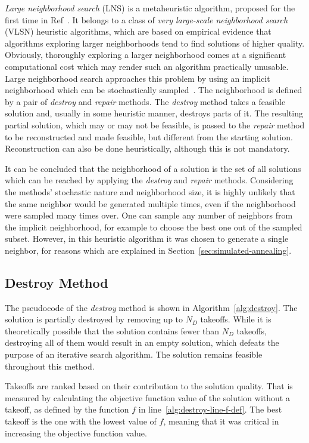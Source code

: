 \textit{Large neighborhood search} (LNS) is a metaheuristic algorithm, proposed for the first time in Ref~\cite{Shaw/LNS}.
It belongs to a class of \textit{very large-scale neighborhood search} (VLSN) heuristic algorithms, which are based on empirical evidence that algorithms exploring larger neighborhoods tend to find solutions of higher quality.
Obviously, thoroughly exploring a larger neighborhood comes at a significant computational cost which may render such an algorithm practically unusable.
Large neighborhood search approaches this problem by using an implicit neighborhood which can be stochastically sampled~\cite{Pisinger/LNS}.
The neighborhood is defined by a pair of \textit{destroy} and \textit{repair} methods.
The \textit{destroy} method takes a feasible solution and, usually in some heuristic manner, destroys parts of it.
The resulting partial solution, which may or may not be feasible, is passed to the \textit{repair} method to be reconstructed and made feasible, but different from the starting solution.
Reconstruction can also be done heuristically, although this is not mandatory.

It can be concluded that the neighborhood of a solution is the set of all solutions which can be reached by applying the \textit{destroy} and \textit{repair} methods.
Considering the methods' stochastic nature and neighborhood size, it is highly unlikely that the same neighbor would be generated multiple times, even if the neighborhood were sampled many times over.
One can sample any number of neighbors from the implicit neighborhood, for example to choose the best one out of the sampled subset. 
However, in this heuristic algorithm it was chosen to generate a single neighbor, for reasons which are explained in Section~\ref{sec:simulated-annealing}.


\subsection{Destroy Method}

The pseudocode of the \textit{destroy} method is shown in Algorithm~\ref{alg:destroy}.
The solution is partially destroyed by removing up to $N_D$ takeoffs.
While it is theoretically possible that the solution contains fewer than $N_D$ takeoffs, destroying all of them would result in an empty solution, which defeats the purpose of an iterative search algorithm.
The solution remains feasible throughout this method.

Takeoffs are ranked based on their contribution to the solution quality.
That is measured by calculating the objective function value of the solution without a takeoff, as defined by the function $f$ in line~\ref{alg:destroy-line-f-def}.
The best takeoff is the one with the lowest value of $f$, meaning that it was critical in increasing the objective function value.

